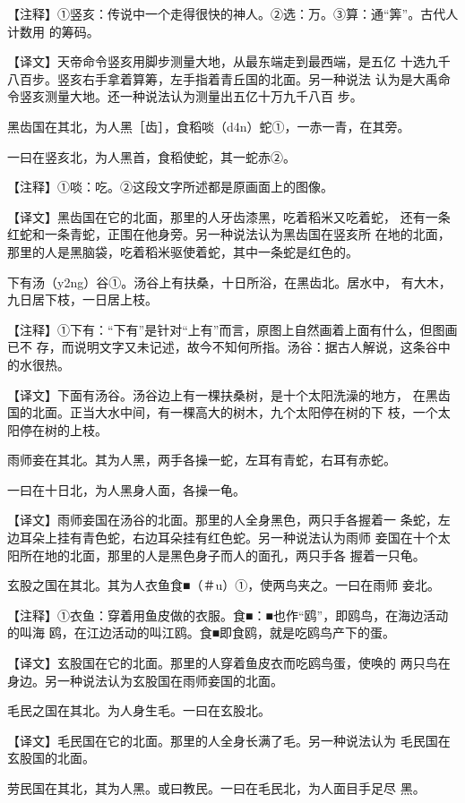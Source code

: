 \documentclass[a4paper,12pt,UTF8,twoside]{ctexbook}
\begin{document}
【注释】①竖亥：传说中一个走得很快的神人。②选：万。③算：通“筭”。古代人计数用 的筹码。

【译文】天帝命令竖亥用脚步测量大地，从最东端走到最西端，是五亿 十选九千八百步。竖亥右手拿着算筹，左手指着青丘国的北面。另一种说法 认为是大禹命令竖亥测量大地。还一种说法认为测量出五亿十万九千八百 步。

黑齿国在其北，为人黑［齿］，食稻啖（d4n）蛇①，一赤一青，在其旁。

一曰在竖亥北，为人黑首，食稻使蛇，其一蛇赤②。

【注释】①啖：吃。②这段文字所述都是原画面上的图像。

【译文】黑齿国在它的北面，那里的人牙齿漆黑，吃着稻米又吃着蛇， 还有一条红蛇和一条青蛇，正围在他身旁。另一种说法认为黑齿国在竖亥所 在地的北面，那里的人是黑脑袋，吃着稻米驱使着蛇，其中一条蛇是红色的。

下有汤（y2ng）谷①。汤谷上有扶桑，十日所浴，在黑齿北。居水中， 有大木，九日居下枝，一日居上枝。

【注释】①下有：“下有”是针对“上有”而言，原图上自然画着上面有什么，但图画已不 存，而说明文字又未记述，故今不知何所指。汤谷：据古人解说，这条谷中的水很热。

【译文】下面有汤谷。汤谷边上有一棵扶桑树，是十个太阳洗澡的地方， 在黑齿国的北面。正当大水中间，有一棵高大的树木，九个太阳停在树的下 枝，一个太阳停在树的上枝。

雨师妾在其北。其为人黑，两手各操一蛇，左耳有青蛇，右耳有赤蛇。

一曰在十日北，为人黑身人面，各操一龟。

【译文】雨师妾国在汤谷的北面。那里的人全身黑色，两只手各握着一 条蛇，左边耳朵上挂有青色蛇，右边耳朵挂有红色蛇。另一种说法认为雨师 妾国在十个太阳所在地的北面，那里的人是黑色身子而人的面孔，两只手各 握着一只龟。

玄股之国在其北。其为人衣鱼食■（＃u）①，使两鸟夹之。一曰在雨师 妾北。

【注释】①衣鱼：穿着用鱼皮做的衣服。食■：■也作“鸥”，即鸥鸟，在海边活动的叫海 鸥，在江边活动的叫江鸥。食■即食鸥，就是吃鸥鸟产下的蛋。

【译文】玄股国在它的北面。那里的人穿着鱼皮衣而吃鸥鸟蛋，使唤的 两只鸟在身边。另一种说法认为玄股国在雨师妾国的北面。

毛民之国在其北。为人身生毛。一曰在玄股北。

【译文】毛民国在它的北面。那里的人全身长满了毛。另一种说法认为 毛民国在玄股国的北面。

劳民国在其北，其为人黑。或曰教民。一曰在毛民北，为人面目手足尽 黑。
\end{document}
